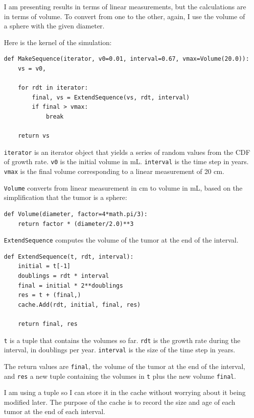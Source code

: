 \documentclass[12pt]{book}
\begin{document}
I am presenting results in terms of linear measurements, but the
calculations are in terms of volume.  To convert from one to the
other, again, I use the volume of a sphere with the given
diameter.

Here is the kernel of the simulation:

\begin{verbatim}
def MakeSequence(iterator, v0=0.01, interval=0.67, vmax=Volume(20.0)):
    vs = v0,

    for rdt in iterator:
        final, vs = ExtendSequence(vs, rdt, interval)
        if final > vmax:
            break

    return vs
\end{verbatim}

{\tt iterator} is an iterator object that yields a series of
random values from the CDF of growth rate.  {\tt v0} is the
initial volume in mL.  {\tt interval} is the time step in years.
{\tt vmax} is the final volume corresponding to a linear measurement
of 20 cm.

{\tt Volume} converts from linear measurement in cm to volume
in mL, based on the simplification that the tumor is a sphere:

\begin{verbatim}
def Volume(diameter, factor=4*math.pi/3):
    return factor * (diameter/2.0)**3
\end{verbatim}

{\tt ExtendSequence} computes the volume of the tumor at the
end of the interval.

\begin{verbatim}
def ExtendSequence(t, rdt, interval):
    initial = t[-1]
    doublings = rdt * interval
    final = initial * 2**doublings
    res = t + (final,)
    cache.Add(rdt, initial, final, res)
    
    return final, res
\end{verbatim}

{\tt t} is a tuple that contains the volumes so far.  {\tt rdt} is
the growth rate during the interval, in doublings per year.
{\tt interval} is the size of the time step in years.

The return values are {\tt final}, the volume of the
tumor at the end of the interval, and {\tt res} a new
tuple containing the volumes in {\tt t} plus the new volume
{\tt final}.

I am using a tuple so I can store it in the cache without
worrying about it being modified later.  The purpose of the
cache is to record the size and age of each tumor at the end
of each interval.
\end{document}
